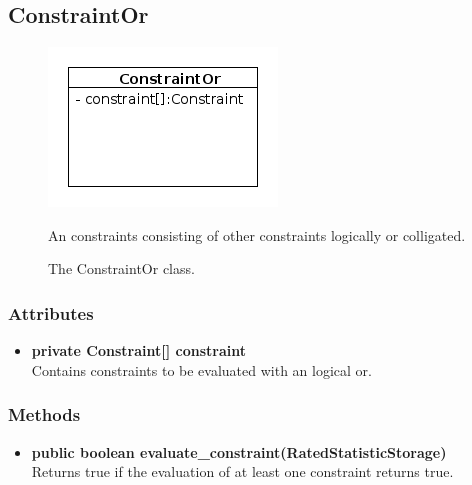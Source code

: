 \subsection{ConstraintOr}
\begin{figure}[htbp]
	\begin{minipage}[t]{8cm}
		\vspace{0pt}
		\centering
		\includegraphics[scale=0.6]{./diagram_pictures/reactor/ConstraintOr.png}
		\caption{The ConstraintOr class.}
	\end{minipage}
	\hfill
	\begin{minipage}[t]{8cm}
		\vspace{10pt}
			An constraints consisting of other constraints logically or colligated.
	\end{minipage}
\end{figure}  

\subsubsection{Attributes}
\begin{itemize}
	\item \textbf{ private Constraint[] constraint }\\
	Contains constraints to be evaluated with an logical or.
\end{itemize}
\subsubsection{Methods}
\begin{itemize}
	\item \textbf{ public boolean evaluate\_constraint(RatedStatisticStorage) }\\
	Returns true if the evaluation of at least one constraint returns true.
\end{itemize}


\newpage
